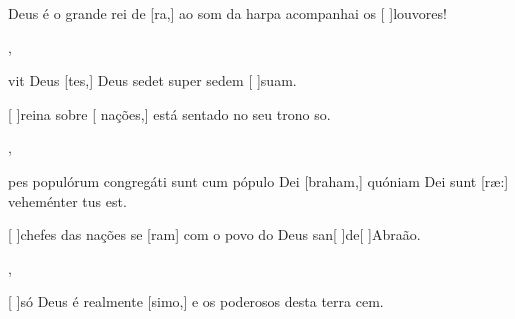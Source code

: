 {        {\item {} Deus é o grande rei de [ra,] ao som da harpa acompanhai os [ ]{lou}{vo}res!~\Antiphona},
    {\item {}vit Deus [tes,] Deus sedet super sedem [ ]{su}am.~\Antiphona}%
        {\item {}[ ]{rei}na sobre [ nações,] está sentado no seu trono so.~\Antiphona},
    {\item {}pes populórum congregáti sunt cum pópulo Dei [braham,] quóniam Dei sunt [\-ræ:] veheménter tus est.~\Antiphona}%
        {\item {}[ ]{che}fes das nações se [ram] com o povo do Deus san[ ]{de}[ ]{A}braão.~\Antiphona},
    {~\Antiphona}%
        {\item {}[ ]{só} Deus é realmente [simo,] e os poderosos desta terra cem.~\Antiphona}
}
